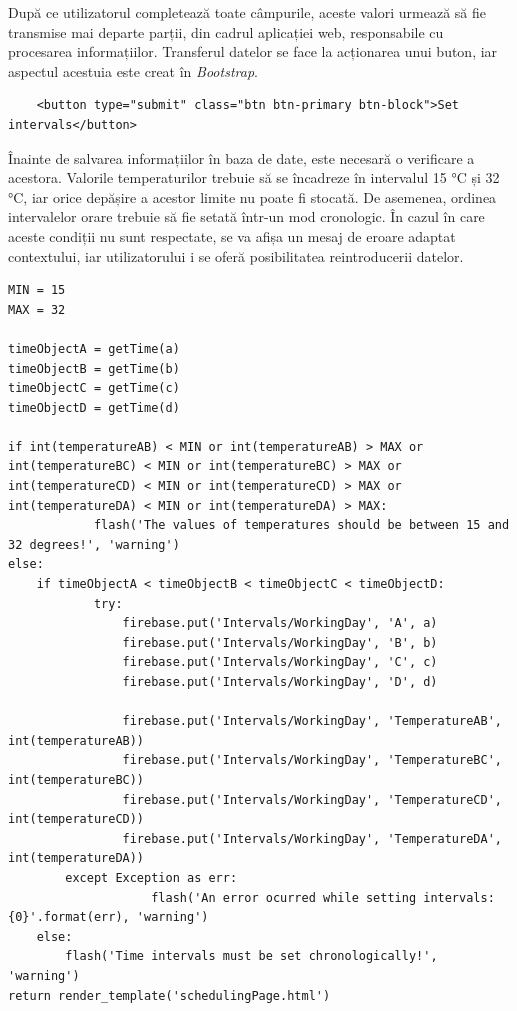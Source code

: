 	După ce utilizatorul completează toate câmpurile, aceste valori urmează să fie transmise mai departe parții, din cadrul aplicației web, responsabile cu procesarea informațiilor. Transferul datelor se face la acționarea unui buton, iar aspectul acestuia este creat în \textit{Bootstrap}.
\vspace{1em}
\begin{lstlisting}
	<button type="submit" class="btn btn-primary btn-block">Set intervals</button>
\end{lstlisting}
\vspace{2em} 

	Înainte de salvarea informațiilor în baza de date, este necesară o verificare a acestora. Valorile temperaturilor trebuie să se încadreze în intervalul 15 °C și 32 °C, iar orice depășire a acestor limite nu poate fi stocată. De asemenea, ordinea intervalelor orare trebuie să fie setată într-un mod cronologic. În cazul în care aceste condiții nu sunt respectate, se va afișa un mesaj de eroare adaptat contextului, iar utilizatorului i se oferă posibilitatea reintroducerii datelor.


\vspace{1em}
\begin{lstlisting}
MIN = 15
MAX = 32

timeObjectA = getTime(a)
timeObjectB = getTime(b)
timeObjectC = getTime(c)
timeObjectD = getTime(d)

if int(temperatureAB) < MIN or int(temperatureAB) > MAX or int(temperatureBC) < MIN or int(temperatureBC) > MAX or     			int(temperatureCD) < MIN or int(temperatureCD) > MAX or int(temperatureDA) < MIN or int(temperatureDA) > MAX:
            flash('The values of temperatures should be between 15 and 32 degrees!', 'warning')
else:
	if timeObjectA < timeObjectB < timeObjectC < timeObjectD:
      		try:
              	firebase.put('Intervals/WorkingDay', 'A', a)
              	firebase.put('Intervals/WorkingDay', 'B', b)
              	firebase.put('Intervals/WorkingDay', 'C', c)
              	firebase.put('Intervals/WorkingDay', 'D', d)

              	firebase.put('Intervals/WorkingDay', 'TemperatureAB', int(temperatureAB))
              	firebase.put('Intervals/WorkingDay', 'TemperatureBC', int(temperatureBC))
              	firebase.put('Intervals/WorkingDay', 'TemperatureCD', int(temperatureCD))
              	firebase.put('Intervals/WorkingDay', 'TemperatureDA', int(temperatureDA))
       	except Exception as err:
                	flash('An error ocurred while setting intervals: {0}'.format(err), 'warning')
	else:
		flash('Time intervals must be set chronologically!', 'warning')
return render_template('schedulingPage.html')
\end{lstlisting}
\vspace{2em} 

